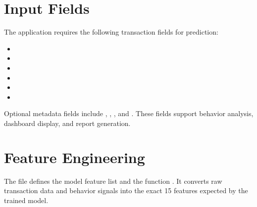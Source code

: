 \documentclass[12pt,a4paper]{report}
\begin{document}
\section{Input Fields}
The application requires the following transaction fields for prediction:
\begin{itemize}
    \item {}
    \item {}
    \item {}
    \item {}
    \item {}
    \item {}
\end{itemize}

Optional metadata fields include , , , and . These fields support behavior analysis, dashboard display, and report generation.

\section{Feature Engineering}
The file  defines the model feature list and the function . It converts raw transaction data and behavior signals into the exact 15 features expected by the trained model.
\end{document}
